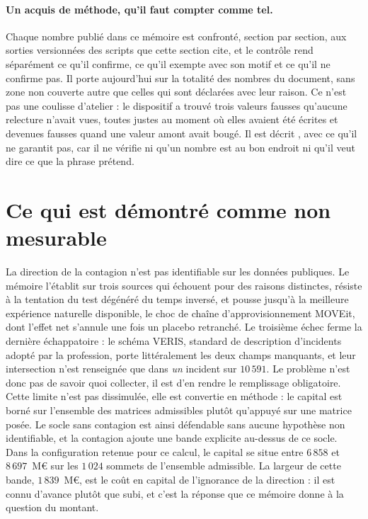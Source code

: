 \paragraph{Un acquis de méthode, qu'il faut compter comme tel.} Chaque nombre publié dans ce
mémoire est confronté, section par section, aux sorties versionnées des scripts que cette section
cite, et le contrôle rend séparément ce qu'il confirme, ce qu'il exempte avec son motif et ce
qu'il ne confirme pas. Il porte aujourd'hui sur la totalité des nombres du document, sans zone
non couverte autre que celles qui sont déclarées avec leur raison. Ce n'est pas une coulisse
d'atelier : le dispositif a trouvé trois valeurs fausses qu'aucune relecture n'avait vues, toutes
justes au moment où elles avaient été écrites et devenues fausses quand une valeur amont avait
bougé. Il est décrit \matcomp, avec ce qu'il ne garantit pas, car il ne vérifie
ni qu'un nombre est au bon endroit ni qu'il veut dire ce que la phrase prétend.


\section{Ce qui est démontré comme non mesurable}
La direction de la contagion n'est pas identifiable sur les données publiques. Le
mémoire l'établit sur trois sources qui échouent pour des raisons distinctes, résiste à la
tentation du test dégénéré du temps inversé, et pousse jusqu'à la meilleure expérience
naturelle disponible, le choc de chaîne d'approvisionnement MOVEit, dont l'effet net
s'annule une fois un placebo retranché. Le troisième échec ferme la dernière échappatoire :
le schéma VERIS, standard de description d'incidents adopté par la profession, porte
littéralement les deux champs manquants, et leur intersection n'est renseignée que dans
\emph{un} incident sur $10\,591$. Le problème n'est donc pas de savoir quoi collecter, il est
d'en rendre le remplissage obligatoire. Cette limite n'est pas dissimulée, elle est
convertie en méthode : le capital est borné sur l'ensemble des matrices admissibles plutôt
qu'appuyé sur une matrice posée. Le socle sans contagion est ainsi défendable sans aucune hypothèse non
identifiable, et la contagion ajoute une bande explicite au-dessus de ce socle. Dans la
configuration retenue pour ce calcul, le capital se situe entre $6\,858$ et $8\,697$~M\euro{} sur
les $1\,024$ sommets de l'ensemble admissible. La largeur de cette bande, $1\,839$~M\euro{}, est le
coût en capital de l'ignorance de la direction : il est connu d'avance plutôt que subi, et c'est
la réponse que ce mémoire donne à la question du montant.

